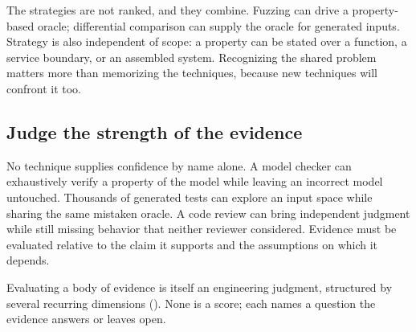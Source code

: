 The strategies are not ranked, and they combine. Fuzzing can drive a property-based oracle;
differential comparison can supply the oracle for generated inputs. Strategy is also independent of
scope: a property can be stated over a function, a service boundary, or an assembled system.
Recognizing the shared problem matters more than memorizing the techniques, because new techniques
will confront it too.

\subsection{Judge the strength of the evidence}\label{sec-strength-of-evidence}

No technique supplies confidence by name alone. A model checker can exhaustively verify a property
of the model while leaving an incorrect model untouched. Thousands of generated tests can explore
an input space while sharing the same mistaken oracle. A code review can bring independent judgment
while still missing behavior that neither reviewer considered. Evidence must be evaluated relative
to the claim it supports and the assumptions on which it depends.

Evaluating a body of evidence is itself an engineering judgment, structured by several recurring
dimensions (\citet{tbl-evidence-strength}). None is a score; each names a question the evidence answers or
leaves open.


